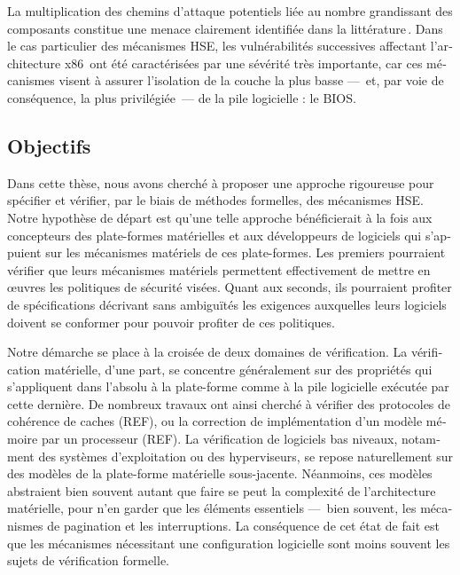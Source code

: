 \begin{otherlanguage}{french}
  La multiplication des chemins d’attaque potentiels liée au nombre grandissant
  des composants constitue une menace clairement identifiée dans la
  littérature\,\cite{wing2003compositionalattack}.
  Dans le cas particulier des mécanismes HSE, les vulnérabilités successives
  affectant l’architecture
  x86\,\cite{duflot2009smram,wojtczuk2009smram,domas2015sinkhole,kallenberg2015racecondition,kovah2015senter}
  ont été caractérisées par une sévérité très importante, car ces mécanismes
  visent à assurer l’isolation de la couche la plus basse ---~et, par voie de
  conséquence, la plus privilégiée~--- de la pile logicielle : le BIOS. 
 
  \subsection*{Objectifs}

  Dans cette thèse, nous avons cherché à proposer une approche rigoureuse pour
  spécifier et vérifier, par le biais de méthodes formelles, des mécanismes HSE.
  Notre hypothèse de départ est qu’une telle approche bénéficierait à la
  fois aux concepteurs des plate-formes matérielles et aux développeurs de
  logiciels qui s'appuient sur les mécanismes matériels de ces plate-formes.
  Les premiers pourraient vérifier que leurs mécanismes matériels permettent
  effectivement de mettre en œuvres les politiques de sécurité visées.
  Quant aux seconds, ils pourraient profiter de spécifications décrivant sans
  ambiguïtés les exigences auxquelles leurs logiciels doivent se conformer pour
  pouvoir profiter de ces politiques.

  Notre démarche se place à la croisée de deux domaines de vérification.
  La vérification matérielle, d’une part, se concentre généralement sur des
  propriétés qui s’appliquent dans l’absolu à la plate-forme comme à la pile
  logicielle exécutée par cette dernière.
  De nombreux travaux ont ainsi cherché à vérifier des protocoles de cohérence
  de caches (REF), ou la correction de implémentation d’un modèle
  mémoire par un processeur (REF). 
  La vérification de logiciels bas niveaux, notamment des systèmes
  d’exploitation ou des hyperviseurs, se repose naturellement sur
  des modèles de la plate-forme matérielle sous-jacente.
  Néanmoins, ces modèles abstraient bien souvent autant que faire se peut la
  complexité de l’architecture matérielle, pour n’en garder que les éléments
  essentiels ---~bien souvent, les mécanismes de pagination et les
  interruptions.
  La conséquence de cet état de fait est que les mécanismes nécessitant une
  configuration logicielle sont moins souvent les sujets de vérification
  formelle.


\end{otherlanguage}
